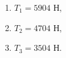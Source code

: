 \begin{enumerate}
	\item $T_1 = 5904$ Н,
	\item $T_2 = 4704$ Н,
	\item $T_3 = 3504$ Н.
\end{enumerate}
